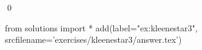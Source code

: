 
\begin{ex} 
  \label{ex:kleenestar3}
  
  \qed
\end{ex} 
\begin{python0}
from solutions import *
add(label="ex:kleenestar3",
    srcfilename='exercises/kleenestar3/answer.tex') 
\end{python0}
